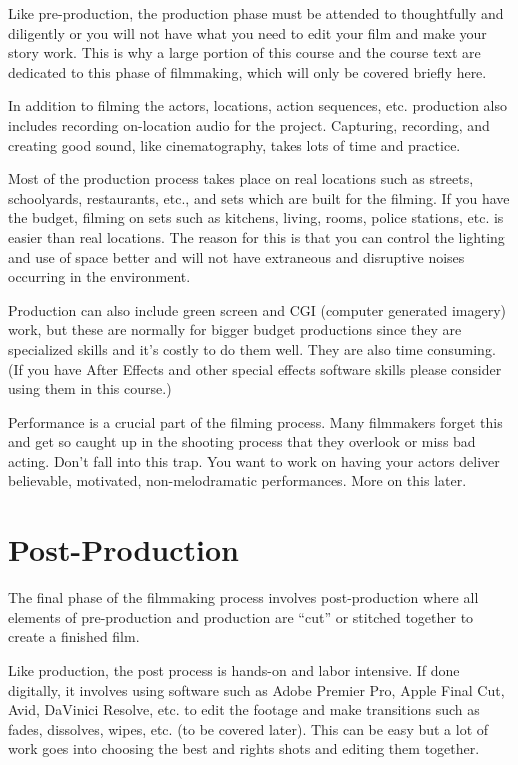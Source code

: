 \documentclass[
]{book}
\begin{document}
Like pre-production, the production phase must be attended to thoughtfully and diligently or you will not have what you need to edit your film and make your story work. This is why a large portion of this course and the course text are dedicated to this phase of filmmaking, which will only be covered briefly here.

In addition to filming the actors, locations, action sequences, etc. production also includes recording on-location audio for the project. Capturing, recording, and creating good sound, like cinematography, takes lots of time and practice.

Most of the production process takes place on real locations such as streets, schoolyards, restaurants, etc., and sets which are built for the filming. If you have the budget, filming on sets such as kitchens, living, rooms, police stations, etc. is easier than real locations. The reason for this is that you can control the lighting and use of space better and will not have extraneous and disruptive noises occurring in the environment.

Production can also include green screen and CGI (computer generated imagery) work, but these are normally for bigger budget productions since they are specialized skills and it's costly to do them well. They are also time consuming. (If you have After Effects and other special effects software skills please consider using them in this course.)

Performance is a crucial part of the filming process. Many filmmakers forget this and get so caught up in the shooting process that they overlook or miss bad acting. Don't fall into this trap. You want to work on having your actors deliver believable, motivated, non-melodramatic performances. More on this later.

\hypertarget{post-production}{%
\section*{Post-Production}\label{post-production}}

The final phase of the filmmaking process involves post-production where all elements of pre-production and production are ``cut'' or stitched together to create a finished film.

Like production, the post process is hands-on and labor intensive. If done digitally, it involves using software such as Adobe Premier Pro, Apple Final Cut, Avid, DaVinici Resolve, etc. to edit the footage and make transitions such as fades, dissolves, wipes, etc. (to be covered later). This can be easy but a lot of work goes into choosing the best and rights shots and editing them together.
\end{document}
